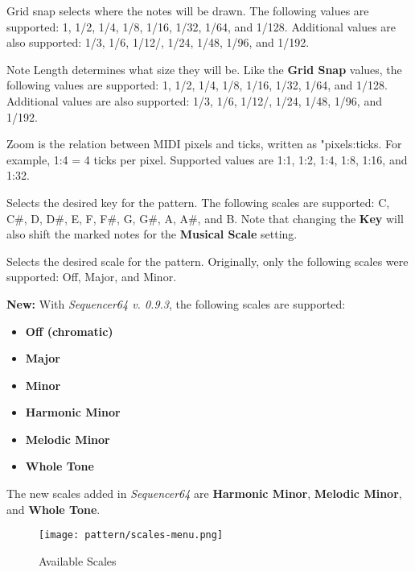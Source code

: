    Grid snap selects where the notes will be drawn.
   The following values are supported:
   1, 1/2, 1/4, 1/8, 1/16, 1/32, 1/64, and 1/128.
   Additional values are also supported:
   1/3, 1/6, 1/12/, 1/24, 1/48, 1/96, and 1/192.

   Note Length determines what size they will be.
   Like the \textbf{Grid Snap} values,
   the following values are supported:
   1, 1/2, 1/4, 1/8, 1/16, 1/32, 1/64, and 1/128.
   Additional values are also supported:
   1/3, 1/6, 1/12/, 1/24, 1/48, 1/96, and 1/192.

   Zoom is the relation between MIDI pixels and ticks, written as
   "pixels:ticks.
   For example, 1:4 = 4 ticks per pixel.
   Supported values are 1:1, 1:2, 1:4, 1:8, 1:16, and 1:32.

   Selects the desired key for the pattern.  The following scales are
   supported:  C, C\#, D, D\#, E, F, F\#, G, G\#, A, A\#, and B.
   Note that changing the \textbf{Key} will also shift the marked notes
   for the \textbf{Musical Scale} setting.

   Selects the desired scale for the pattern.
   Originally, only the following scales were supported: Off, Major, and Minor.

   \textbf{New:}
   With \textsl{Sequencer64 v. 0.9.3}, the following scales are supported:

   \begin{itemize}
      \item \textbf{Off (chromatic)}
      \item \textbf{Major}
      \item \textbf{Minor}
      \item \textbf{Harmonic Minor}
      \item \textbf{Melodic Minor}
      \item \textbf{Whole Tone}
   \end{itemize}

   The new scales added in \textsl{Sequencer64} are
   \textbf{Harmonic Minor}, \textbf{Melodic Minor}, and \textbf{Whole Tone}.

\begin{figure}[H]
   \centering 
   \texttt{[image: pattern/scales-menu.png]}
   \caption{Available Scales}
   \label{fig:pattern_editor_available_scales}
\end{figure}

